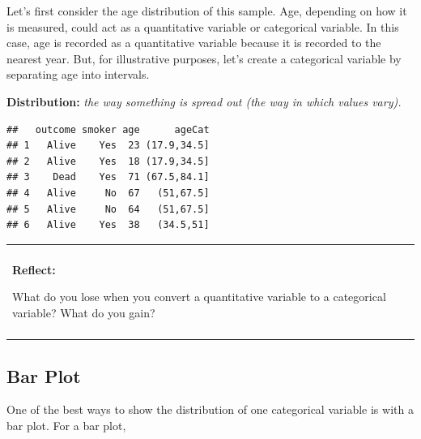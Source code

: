 \documentclass[]{book}
\newenvironment{Shaded}{\begin{snugshade}}{\end{snugshade}}
\newcommand{\CommentTok}[1]{\textcolor[rgb]{0.56,0.35,0.01}{\textit{#1}}}
\newcommand{\DataTypeTok}[1]{\textcolor[rgb]{0.13,0.29,0.53}{#1}}
\newcommand{\DecValTok}[1]{\textcolor[rgb]{0.00,0.00,0.81}{#1}}
\newcommand{\KeywordTok}[1]{\textcolor[rgb]{0.13,0.29,0.53}{\textbf{#1}}}
\newcommand{\NormalTok}[1]{#1}
\newcommand{\OperatorTok}[1]{\textcolor[rgb]{0.81,0.36,0.00}{\textbf{#1}}}
\newcommand{\StringTok}[1]{\textcolor[rgb]{0.31,0.60,0.02}{#1}}
\newenvironment{reflect}
{
    \begin{center}
    
    \begin{tabular}{|p{0.8\textwidth}|}
    \rowcolor{LightBlue}
    \hline\\
    \rowcolor{LightBlue}
    \textbf{Reflect:}
}
{
    \\\rowcolor{LightBlue}
    \\\hline
    \end{tabular} 
    \end{center}
}
\begin{document}
Let's first consider the age distribution of this sample. Age, depending on how it is measured, could act as a quantitative variable or categorical variable. In this case, age is recorded as a quantitative variable because it is recorded to the nearest year. But, for illustrative purposes, let's create a categorical variable by separating age into intervals.

\textbf{Distribution:} \emph{the way something is spread out (the way in which values vary).}

\begin{Shaded}
\end{Shaded}

\begin{verbatim}
##   outcome smoker age      ageCat
## 1   Alive    Yes  23 (17.9,34.5]
## 2   Alive    Yes  18 (17.9,34.5]
## 3    Dead    Yes  71 (67.5,84.1]
## 4   Alive     No  67   (51,67.5]
## 5   Alive     No  64   (51,67.5]
## 6   Alive    Yes  38   (34.5,51]
\end{verbatim}

\begin{reflect}
What do you lose when you convert a quantitative variable to a
categorical variable? What do you gain?
\end{reflect}

\hypertarget{bar-plot}{%
\subsection{Bar Plot}\label{bar-plot}}

One of the best ways to show the distribution of one categorical variable is with a bar plot. For a bar plot,
\end{document}
